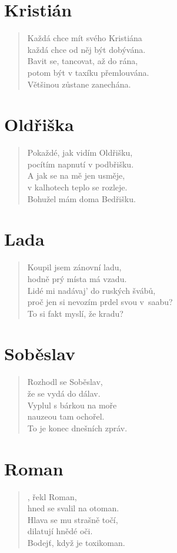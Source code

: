 \section*{Kristián}
\begin{verse}
Každá chce mít svého Kristiána\\
každá chce od něj být dobývána.\\
Bavit se, tancovat, až do rána,\\
potom být v taxíku přemlouvána.\\
Většinou zůstane zanechána.
\end{verse}

\section*{Oldřiška}
\begin{verse}
Pokaždé, jak vidím Oldřišku,\\
pocítím napnutí v podbřišku.\\
A jak se na mě jen usměje,\\
v kalhotech teplo se rozleje.\\
Bohužel mám doma Bedřišku.
\end{verse}

\section*{Lada}
\begin{verse}
Koupil jsem zánovní ladu,\\
hodně prý místa má vzadu.\\
Lidé mi nadávaj' do ruských švábů,\\
proč jen si nevozím prdel svou v~saabu?\\
To si fakt myslí, že kradu?
\end{verse}

\section*{Soběslav}
\begin{verse}
Rozhodl se Soběslav,\\
že se vydá do dálav.\\
Vyplul s bárkou na moře\\
nauzeou tam ochořel.\\
To je konec dnešních zpráv.
\end{verse}

\section*{Roman}
\begin{verse}
, řekl Roman,\\
hned se svalil na otoman.\\
Hlava se mu strašně točí,\\
dilatují hnědé oči.\\
Bodejť, když je toxikoman.
\end{verse}

